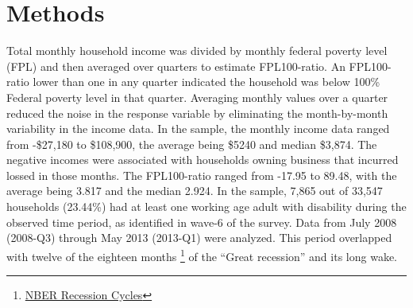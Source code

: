 \documentclass[11pt]{extarticle} %
\begin{document}
\section{Methods}
Total monthly household income was divided by monthly federal poverty level (FPL) and then averaged over quarters to estimate FPL100-ratio. An FPL100-ratio lower than one in any quarter indicated the household was below 100\% Federal poverty level in that quarter. Averaging monthly values over a quarter reduced the noise in the response variable by eliminating the month-by-month variability in the income data. In the sample, the monthly income data ranged from -\$27,180 to \$108,900, the average being \$5240 and median \$3,874. The negative incomes were associated with households owning business that incurred lossed in those months. The FPL100-ratio ranged from -17.95 to 89.48, with the average being 3.817 and the median 2.924. In the sample, 7,865 out of 33,547 households (23.44\%) had at least one working age adult with disability during the observed time period, as identified in wave-6 of the survey. Data from July 2008 (2008-Q3) through May 2013 (2013-Q1) were analyzed. This period overlapped with twelve of the eighteen months {\footnote{\href{http://www.nber.org/cycles/}{NBER Recession Cycles}}} of the ``Great recession'' and its long wake. 
\end{document}
